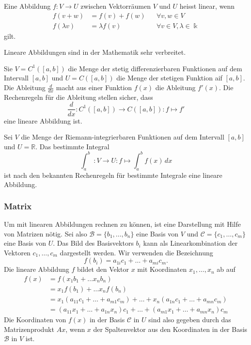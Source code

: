 \begin{definition}
Eine Abbildung $f\colon V\to U$ zwischen Vektorräumen $V$ und $U$
heisst linear, wenn
\[
\begin{aligned}
f(v+w) &= f(v) + f(w)&&\forall v,w\in V 
\\
f(\lambda v) &= \lambda f(v) &&\forall v\in V,\lambda \in \Bbbk
\end{aligned}
\]
gilt.
\end{definition}

Lineare Abbildungen sind in der Mathematik sehr verbreitet.

\begin{beispiel}
Sie $V=C^1([a,b])$ die Menge der stetig differenzierbaren Funktionen 
auf dem Intervall $[a,b]$ und $U=C([a,b])$ die Menge der
stetigen Funktion aif $[a,b]$. 
Die Ableitung $\frac{d}{dx}$ macht aus einer Funktion $f(x)$ die
Ableitung $f'(x)$.
Die Rechenregeln für die Ableitung stellen sicher, dass 
\[
\frac{d}{dx}
\colon
C^1([a,b]) \to  C([a,b]) 
:
f \mapsto f'
\]
eine lineare Abbildung ist.
\end{beispiel}

\begin{beispiel}
Sei $V$ die Menge der Riemann-integrierbaren Funktionen auf dem
Intervall $[a,b]$ und $U=\mathbb{R}$.
Das bestimmte Integral
\[
\int_a^b \;\colon V \to U : f \mapsto \int_a^b f(x)\,dx
\]
ist nach den bekannten Rechenregeln für bestimmte Integrale
eine lineare Abbildung.
\end{beispiel}

\subsubsection{Matrix}
Um mit linearen Abbildungen rechnen zu können, ist eine Darstellung 
mit Hilfe von Matrizen nötig.
Sei also $\mathcal{B}=\{b_1,\dots,b_n\}$ eine Basis von $V$ und
$\mathcal{C} = \{ c_1,\dots,c_m\}$ eine Basis von $U$.
Das Bild des Basisvektors $b_i$ kann als Linearkombination der
Vektoren $c_1,\dots,c_m$ dargestellt werden.
Wir verwenden die Bezeichnung
\[
f(b_i) 
=
a_{1i} c_1 + \dots + a_{mi} c_m.
\]
Die lineare Abbildung $f$ bildet den Vektor $x$ mit Koordinaten
$x_1,\dots,x_n$ ab auf 
\begin{align*}
f(x)
&=
f(x_1b_1  + \dots x_nb_n)
\\
&=
x_1 f(b_1) + \dots x_nf(b_n)
\\
&=
x_1(a_{11} c_1 + \dots + a_{m1} c_m)
+
\dots
+
x_n(a_{1n} c_1 + \dots + a_{mn} c_m)
\\
&=
( a_{11} x_1 + \dots + a_{1n} x_n ) c_1
+
\dots
+
( a_{m1} x_1 + \dots + a_{mn} x_n ) c_m
\end{align*}
Die Koordinaten von $f(x)$ in der Basis $\mathcal{C}$ in $U$ sind 
also gegeben durch das Matrizenprodukt $Ax$, wenn $x$ der Spaltenvektor
aus den Koordinaten in der Basis $\mathcal{B}$ in $V$ ist.


